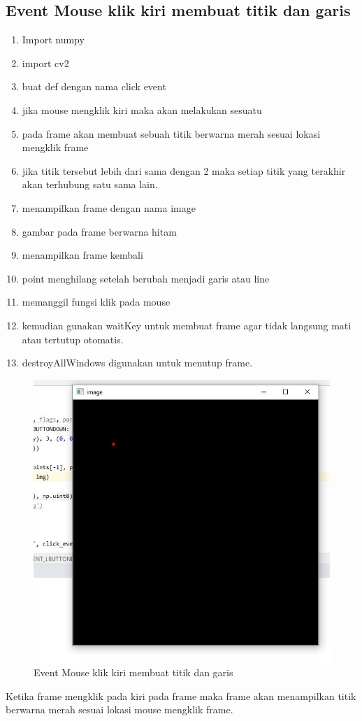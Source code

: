 \newpage
\subsection{Event Mouse klik kiri membuat titik dan garis}

\begin{enumerate}
	\item Import numpy
	\item import cv2
	\item buat def dengan nama click event
	\item jika mouse mengklik kiri maka akan melakukan sesuatu
	\item pada frame akan membuat sebuah titik berwarna merah sesuai lokasi mengklik frame
	\item jika titik tersebut lebih dari sama dengan 2 maka setiap titik yang terakhir akan terhubung satu sama lain.
	\item menampilkan frame dengan nama image
	\item gambar pada frame berwarna hitam
	\item menampilkan frame kembali
	\item point menghilang setelah berubah menjadi garis atau line
	\item memanggil fungsi klik pada mouse
	\item kemudian gunakan waitKey untuk membuat frame agar tidak langsung mati atau tertutup otomatis.
	\item destroyAllWindows digunakan untuk menutup frame.
\end{enumerate}

\newpage
\begin{figure}[ht]
\centering
\includegraphics[scale=0.7]{figures/2,23.jpg}
\caption{Event Mouse klik kiri membuat titik dan garis}
\label{contoh}
\end{figure}
Ketika frame mengklik pada kiri pada frame maka frame akan menampilkan titik berwarna merah sesuai lokasi mouse mengklik frame.

